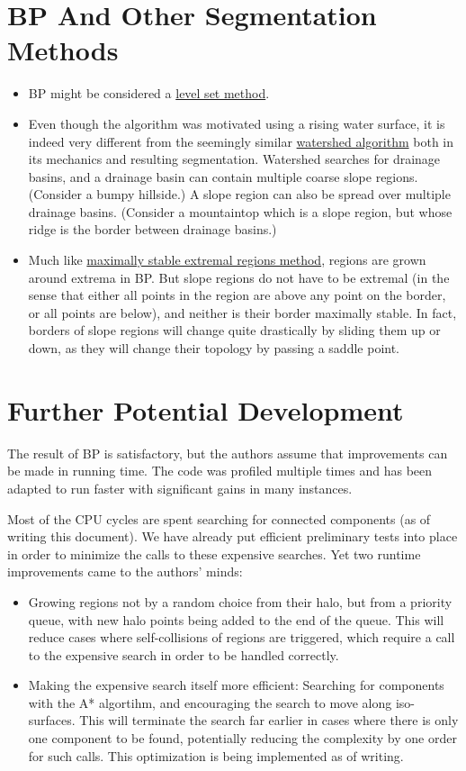\documentclass[a4paper,12pt,notitlepage,fullpage]{paper}
\theoremstyle{plain}
\theoremstyle{definition}
\begin{document}
\section{BP And Other Segmentation Methods}
\begin{itemize}
\item BP might be considered a \href{https://en.wikipedia.org/wiki/Level-set_method}{level set method}.
\item Even though the algorithm was motivated using a rising water surface, it is indeed very different from the seemingly similar \href{https://en.wikipedia.org/wiki/Watershed_(image_processing)}{watershed algorithm} both in its mechanics and resulting segmentation. Watershed searches for drainage basins, and a drainage basin can contain multiple coarse slope regions. (Consider a bumpy hillside.) A slope region can also be spread over multiple drainage basins. (Consider a mountaintop which is a slope region, but whose ridge is the border between drainage basins.)
\item Much like \href{https://en.wikipedia.org/wiki/Maximally_stable_extremal_regions}{maximally stable extremal regions method}, regions are grown around extrema in BP. But slope regions do not have to be extremal (in the sense that either all points in the region are above any point on the border, or all points are below), and neither is their border maximally stable. In fact, borders of slope regions will change quite drastically by sliding them up or down, as they will change their topology by passing a saddle point.
\end{itemize}


\section{Further Potential Development}
The result of BP is satisfactory, but the authors assume that improvements can be made in running time. The code was profiled multiple times and has been adapted to run faster with significant gains in many instances.

Most of the CPU cycles are spent searching for connected components (as of writing this document). We have already put efficient preliminary tests into place in order to minimize the calls to these expensive searches. Yet two runtime improvements came to the authors' minds:
\begin{itemize}
\item Growing regions not by a random choice from their halo, but from a priority queue, with new halo points being added to the end of the queue. This will reduce cases where self-collisions of regions are triggered, which require a call to the expensive search in order to be handled correctly.
\item Making the expensive search itself more efficient: Searching for components with the A* algortihm, and encouraging the search to move along iso-surfaces. This will terminate the search far earlier in cases where there is only one component to be found, potentially reducing the complexity by one order for such calls. This optimization is being implemented as of writing.
\end{itemize}
\end{document}
